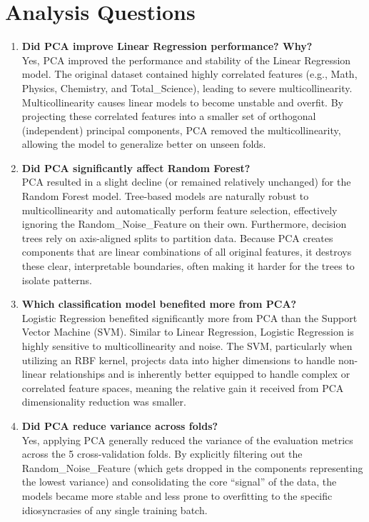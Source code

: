 \documentclass[11pt]{article}
\begin{document}
\section*{Analysis Questions}

\begin{enumerate}

\item \textbf{Did PCA improve Linear Regression performance? Why?} \\
Yes, PCA improved the performance and stability of the Linear Regression model. The original dataset contained highly correlated features (e.g., Math, Physics, Chemistry, and Total\_Science), leading to severe multicollinearity. Multicollinearity causes linear models to become unstable and overfit. By projecting these correlated features into a smaller set of orthogonal (independent) principal components, PCA removed the multicollinearity, allowing the model to generalize better on unseen folds.

\item \textbf{Did PCA significantly affect Random Forest?} \\
PCA resulted in a slight decline (or remained relatively unchanged) for the Random Forest model. Tree-based models are naturally robust to multicollinearity and automatically perform feature selection, effectively ignoring the Random\_Noise\_Feature on their own. Furthermore, decision trees rely on axis-aligned splits to partition data. Because PCA creates components that are linear combinations of all original features, it destroys these clear, interpretable boundaries, often making it harder for the trees to isolate patterns.

\item \textbf{Which classification model benefited more from PCA?} \\
Logistic Regression benefited significantly more from PCA than the Support Vector Machine (SVM). Similar to Linear Regression, Logistic Regression is highly sensitive to multicollinearity and noise. The SVM, particularly when utilizing an RBF kernel, projects data into higher dimensions to handle non-linear relationships and is inherently better equipped to handle complex or correlated feature spaces, meaning the relative gain it received from PCA dimensionality reduction was smaller.

\item \textbf{Did PCA reduce variance across folds?} \\
Yes, applying PCA generally reduced the variance of the evaluation metrics across the 5 cross-validation folds. By explicitly filtering out the Random\_Noise\_Feature (which gets dropped in the components representing the lowest variance) and consolidating the core ``signal'' of the data, the models became more stable and less prone to overfitting to the specific idiosyncrasies of any single training batch.


\end{enumerate}
\end{document}
